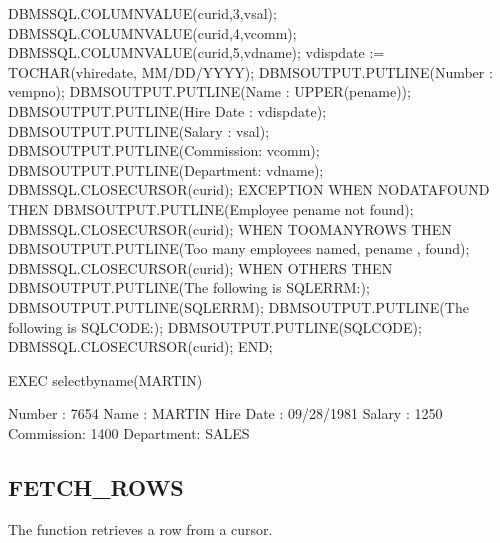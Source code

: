 \documentclass[letterpaper,10pt,english,openany,oneside]{sphinxmanual}
\begin{document}
\begin{sphinxVerbatim}[commandchars=\\\{\}]
    DBMS\PYGZus{}SQL.COLUMN\PYGZus{}VALUE(curid,3,v\PYGZus{}sal);
    DBMS\PYGZus{}SQL.COLUMN\PYGZus{}VALUE(curid,4,v\PYGZus{}comm);
    DBMS\PYGZus{}SQL.COLUMN\PYGZus{}VALUE(curid,5,v\PYGZus{}dname);
    v\PYGZus{}disp\PYGZus{}date := TO\PYGZus{}CHAR(v\PYGZus{}hiredate, \PYGZsq{}MM/DD/YYYY\PYGZsq{});
    DBMS\PYGZus{}OUTPUT.PUT\PYGZus{}LINE(\PYGZsq{}Number    : \PYGZsq{} \textbar{}\textbar{} v\PYGZus{}empno);
    DBMS\PYGZus{}OUTPUT.PUT\PYGZus{}LINE(\PYGZsq{}Name      : \PYGZsq{} \textbar{}\textbar{} UPPER(p\PYGZus{}ename));
    DBMS\PYGZus{}OUTPUT.PUT\PYGZus{}LINE(\PYGZsq{}Hire Date : \PYGZsq{} \textbar{}\textbar{} v\PYGZus{}disp\PYGZus{}date);
    DBMS\PYGZus{}OUTPUT.PUT\PYGZus{}LINE(\PYGZsq{}Salary    : \PYGZsq{} \textbar{}\textbar{} v\PYGZus{}sal);
    DBMS\PYGZus{}OUTPUT.PUT\PYGZus{}LINE(\PYGZsq{}Commission: \PYGZsq{} \textbar{}\textbar{} v\PYGZus{}comm);
    DBMS\PYGZus{}OUTPUT.PUT\PYGZus{}LINE(\PYGZsq{}Department: \PYGZsq{} \textbar{}\textbar{} v\PYGZus{}dname);
    DBMS\PYGZus{}SQL.CLOSE\PYGZus{}CURSOR(curid);
EXCEPTION
    WHEN NO\PYGZus{}DATA\PYGZus{}FOUND THEN
        DBMS\PYGZus{}OUTPUT.PUT\PYGZus{}LINE(\PYGZsq{}Employee \PYGZsq{} \textbar{}\textbar{} p\PYGZus{}ename \textbar{}\textbar{} \PYGZsq{} not found\PYGZsq{});
        DBMS\PYGZus{}SQL.CLOSE\PYGZus{}CURSOR(curid);
    WHEN TOO\PYGZus{}MANY\PYGZus{}ROWS THEN
        DBMS\PYGZus{}OUTPUT.PUT\PYGZus{}LINE(\PYGZsq{}Too many employees named, \PYGZsq{} \textbar{}\textbar{}
            p\PYGZus{}ename \textbar{}\textbar{} \PYGZsq{}, found\PYGZsq{});
        DBMS\PYGZus{}SQL.CLOSE\PYGZus{}CURSOR(curid);
    WHEN OTHERS THEN
        DBMS\PYGZus{}OUTPUT.PUT\PYGZus{}LINE(\PYGZsq{}The following is SQLERRM:\PYGZsq{});
        DBMS\PYGZus{}OUTPUT.PUT\PYGZus{}LINE(SQLERRM);
        DBMS\PYGZus{}OUTPUT.PUT\PYGZus{}LINE(\PYGZsq{}The following is SQLCODE:\PYGZsq{});
        DBMS\PYGZus{}OUTPUT.PUT\PYGZus{}LINE(SQLCODE);
        DBMS\PYGZus{}SQL.CLOSE\PYGZus{}CURSOR(curid);
END;

EXEC select\PYGZus{}by\PYGZus{}name(\PYGZsq{}MARTIN\PYGZsq{})

Number    : 7654
Name      : MARTIN
Hire Date : 09/28/1981
Salary    : 1250
Commission: 1400
Department: SALES
\end{sphinxVerbatim}

\newpage


\subsection{FETCH\_ROWS}
\label{\detokenize{fetch_rows::doc}}\label{\detokenize{fetch_rows:fetch-rows}}
The  function retrieves a row from a cursor.
\begin{quote}

\end{quote}
\end{document}
